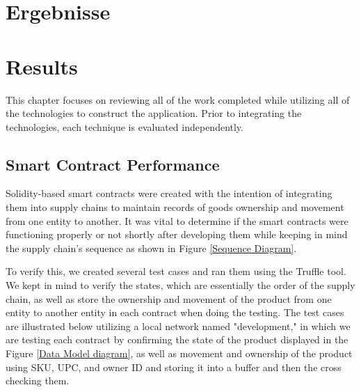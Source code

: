 {\chapter{Ergebnisse}}
{\chapter{Results}}

\label{sec:results}

This chapter focuses on reviewing all of the work completed while utilizing all of the technologies to construct the application. Prior to integrating the technologies, each technique is evaluated independently.

\section{Smart Contract Performance }

Solidity-based smart contracts were created with the intention of integrating them into supply chains to maintain records of goods ownership and movement from one entity to another. It was vital to determine if the smart contracts were functioning properly or not shortly after developing them while keeping in mind the supply chain's sequence as shown in Figure \ref{Sequence Diagram}. 

\vspace{.5cm}

To verify this, we created several test cases and ran them using the Truffle tool. We kept in mind to verify the states, which are essentially the order of the supply chain, as well as store the ownership and movement of the product from one entity to another entity in each contract when doing the testing. The test cases are illustrated below utilizing a local network named "development," in which we are testing each contract by confirming the state of the product displayed in the Figure \ref{Data Model diagram}, as well as movement and ownership of the product using \ac{SKU}, \ac{UPC}, and owner ID and storing it into a buffer and then the cross checking them.

\vspace{.5cm}


